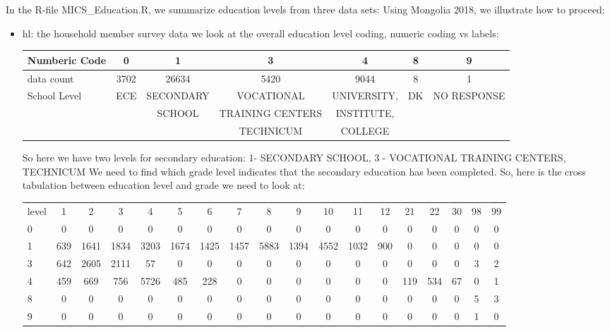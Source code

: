 \documentclass[12pt]{article}
\begin{document}
In the R-file MICS\_Education.R, we summarize education levels from three data sets:
Using Mongolia 2018, we illustrate how to proceed:
\begin{itemize}
	\item hl: the household member survey data
	we look at the overall education level coding, numeric coding vs labels:
	
	{\small
	\begin{tabular}{l|c|c|c|c|c|c|}
		\hline
     Numberic Code & 0 & 1 & 3 & 4 & 8 & 9 \\
     	\hline
	 data count & 3702 & 26634 & 5420 & 9044 & 8 & 1 \\
	 	\hline
	 School Level & ECE & SECONDARY  & VOCATIONAL& UNIVERSITY,  & DK & NO RESPONSE \\ 
	     &   & SCHOOL & TRAINING CENTERS & INSTITUTE, & & \\
	     &   &  &  TECHNICUM & COLLEGE & & \\
   		\hline
	\end{tabular}
    }
    So here we have two levels for secondary education: 
    1- SECONDARY SCHOOL, 3 - VOCATIONAL TRAINING CENTERS, TECHNICUM
    We need to find which grade level indicates that the secondary education has been completed.
    So, here is the cross tabulation between education level and grade we need to look at:
    
    	{\small
    	\begin{tabular}{l|c|c|c|c|c|c|c|c|c|c|c|c|c|c|c|c|c|}
    	\hline
    	level &    1  &   2   &   3   &   4  &   5   &  6   &   7   &   8    &   9   &   10   &   11   &   12   &   21   &  22   &   30   &   98   &  99\\
    	0  & 0    &  0  &   0  &  0  &  0   &  0   &   0   &    0   &   0   &   0 & 0 & 0 & 0 & 0 & 0 & 0 & 0 \\
    	1   &   639 & 1641 & 1834 & 3203 & 1674 & 1425 & 1457 & 5883 & 1394 & 4552 & 1032  & 900 & 0 & 0 & 0 & 0 & 0 \\
    	3   &   642 & 2605 & 2111  &  57 & 0 & 0 & 0 & 0 & 0 & 0 & 0 & 0 & 0 & 0 & 0 & 3 & 2 \\
    	4   &   459 &  669  & 756 & 5726  & 485  & 228 & 0 & 0 & 0 & 0 & 0 & 0   & 119  & 534  &  67 & 0 & 1 \\
    	8   &   0   &   0 & 0 & 0 & 0 & 0 & 0 & 0 & 0 & 0 & 0 & 0 & 0 & 0 & 0 & 5 & 3 \\
    	9   &   0  &  0 & 0 & 0 & 0 & 0 & 0 & 0 & 0 & 0 & 0 & 0 & 0 & 0 & 0 & 1 & 0 \\
    	\hline
    	\end{tabular}
    }


\end{itemize}
\end{document}
